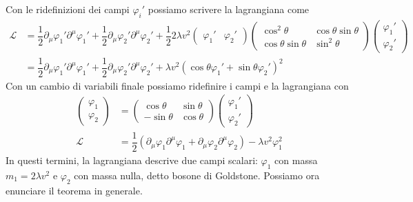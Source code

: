 \documentclass[italian,a4paper]{article}
\theoremstyle{definition}
\newcommand{\lagr}{\ensuremath{\mathscr{L}}}
\begin{document}
Con le ridefinizioni dei campi $\varphi_i'$ possiamo scrivere la lagrangiana
come
\begin{align*}
    \lagr &= 
    \dfrac{1}{2}\partial_\mu \varphi_1'\partial^\mu \varphi_1' +
    \dfrac{1}{2}\partial_\mu \varphi_2'\partial^\mu \varphi_2' +
    \dfrac{1}{2}2\lambda v^2
    \begin{pmatrix}
        \varphi_1' & \varphi_2'
    \end{pmatrix}
    \begin{pmatrix}
        \cos^2 \theta & \cos\theta \sin\theta\\
        \cos\theta \sin\theta & \sin^2 \theta
    \end{pmatrix}
    \begin{pmatrix}
        \varphi_1'\\
        \varphi_2'
    \end{pmatrix}\\
    &= 
    \dfrac{1}{2}\partial_\mu \varphi_1'\partial^\mu \varphi_1' +
    \dfrac{1}{2}\partial_\mu \varphi_2'\partial^\mu \varphi_2' +
    \lambda v^2(\cos\theta \varphi_1' + \sin\theta \varphi_2')^2
\end{align*}
Con un cambio di variabili finale possiamo ridefinire i campi e la
lagrangiana con
\begin{align*}
    \begin{pmatrix}
        \varphi_1\\
        \varphi_2
    \end{pmatrix} &= 
    \begin{pmatrix}
        \cos \theta & \sin \theta \\
        -\sin \theta & \cos \theta
    \end{pmatrix}
     \begin{pmatrix}
        \varphi_1'\\
        \varphi_2'
    \end{pmatrix}\\
\lagr &=
    \dfrac{1}{2}(\partial_\mu \varphi_1\partial^\mu \varphi_1 +
    \partial_\mu \varphi_2\partial^\mu \varphi_2) -
    \lambda v^2 \varphi_1^2
\end{align*}
In questi termini, la lagrangiana descrive due campi scalari: $\varphi_1$ con massa
$m_1 = 2\lambda v^2$ e $\varphi_2$ con massa nulla, detto bosone di
Goldstone. Possiamo ora enunciare il teorema in generale.
\end{document}
